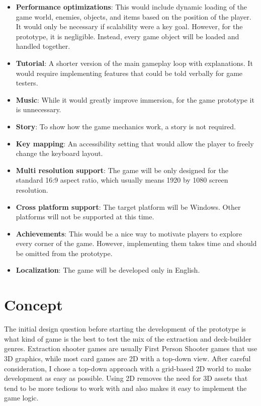 \begin{itemize}
    \item \textbf{Performance optimizations}: This would include dynamic loading of the game world, enemies, objects, and items based on the position of the player. It would only be necessary if scalability were a key goal. However, for the prototype, it is negligible. Instead, every game object will be loaded and handled together.
    \item \textbf{Tutorial}: A shorter version of the main gameplay loop with explanations. It would require implementing features that could be told verbally for game testers.
    \item \textbf{Music}: While it would greatly improve immersion, for the game prototype it is unnecessary.
    \item \textbf{Story}: To show how the game mechanics work, a story is not required.
    \item \textbf{Key mapping}: An accessibility setting that would allow the player to freely change the keyboard layout.
    \item \textbf{Multi resolution support}: The game will be only designed for the standard 16:9 aspect ratio, which usually means 1920 by 1080 screen resolution.
    \item \textbf{Cross platform support}: The target platform will be Windows. Other platforms will not be supported at this time.
    \item \textbf{Achievements}: This would be a nice way to motivate players to explore every corner of the game. However, implementing them takes time and should be omitted from the prototype.
    \item \textbf{Localization}: The game will be developed only in English.
\end{itemize}



\section{Concept} \label{section:concept}

The initial design question before starting the development of the prototype is what kind of game is the best to test the mix of the extraction and deck-builder genres. Extraction shooter games are usually First Person Shooter games that use 3D graphics, while most card games are 2D with a top-down view. After careful consideration, I chose a top-down approach with a grid-based 2D world to make development as easy as possible. Using 2D removes the need for 3D assets that tend to be more tedious to work with and also makes it easy to implement the game logic. 

